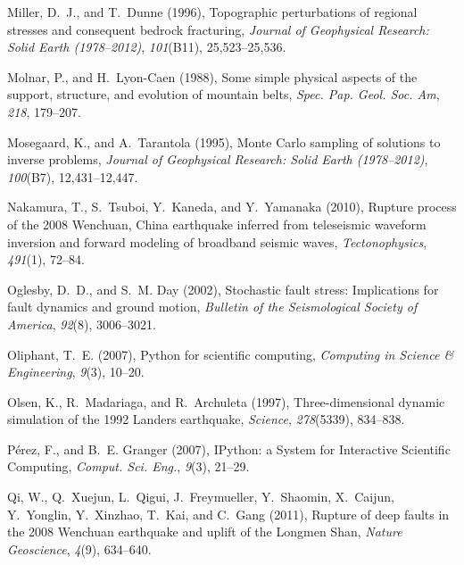 \documentclass[twocolumn,jgrga]{AGUTeX}
\begin{document}
\begin{article}
{{\begin{thebibliography}{87}
Miller, D.~J., and T.~Dunne (1996), Topographic perturbations of regional
  stresses and consequent bedrock fracturing, \textit{Journal of Geophysical
  Research: Solid Earth (1978--2012)}, \textit{101}(B11), 25,523--25,536.

Molnar, P., and H.~Lyon-Caen (1988), Some simple physical aspects of the
  support, structure, and evolution of mountain belts, \textit{Spec. Pap. Geol.
  Soc. Am}, \textit{218}, 179--207.

Mosegaard, K., and A.~Tarantola (1995), Monte {C}arlo sampling of solutions to
  inverse problems, \textit{Journal of Geophysical Research: Solid Earth
  (1978--2012)}, \textit{100}(B7), 12,431--12,447.

Nakamura, T., S.~Tsuboi, Y.~Kaneda, and Y.~Yamanaka (2010), Rupture process of
  the 2008 {W}enchuan, {C}hina earthquake inferred from teleseismic waveform
  inversion and forward modeling of broadband seismic waves,
  \textit{Tectonophysics}, \textit{491}(1), 72--84.

Oglesby, D.~D., and S.~M. Day (2002), Stochastic fault stress: {I}mplications
  for fault dynamics and ground motion, \textit{Bulletin of the Seismological
  Society of America}, \textit{92}(8), 3006--3021.

Oliphant, T.~E. (2007), Python for scientific computing, \textit{Computing in
  Science \& Engineering}, \textit{9}(3), 10--20.

Olsen, K., R.~Madariaga, and R.~Archuleta (1997), Three-dimensional dynamic
  simulation of the 1992 {L}anders earthquake, \textit{Science},
  \textit{278}(5339), 834--838.

P\'erez, F., and B.~E. Granger (2007), {IP}ython: a {S}ystem for {I}nteractive
  {S}cientific {C}omputing, \textit{{C}omput. {S}ci. {E}ng.}, \textit{9}(3),
  21--29.

Qi, W., Q.~Xuejun, L.~Qigui, J.~Freymueller, Y.~Shaomin, X.~Caijun, Y.~Yonglin,
  Y.~Xinzhao, T.~Kai, and C.~Gang (2011), Rupture of deep faults in the 2008
  {W}enchuan earthquake and uplift of the {L}ongmen {S}han, \textit{Nature
  Geoscience}, \textit{4}(9), 634--640.


\end{thebibliography}}}
\end{article}
\end{document}
